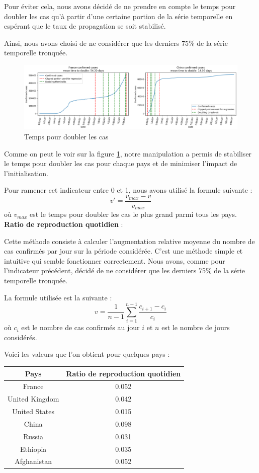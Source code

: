 \documentclass[12pt]{iEEEtran}
\begin{document}
Pour éviter cela, nous avons décidé de ne prendre en compte le temps pour doubler les cas qu'à partir
d'une certaine portion de la série temporelle en espérant que le taux de propagation se soit stabilisé.

Ainsi, nous avons choisi de ne considérer que les derniers 75\% de la série temporelle tronquée.

\begin{figure}[h]
    \centering
    \includegraphics[width=\columnwidth]{img/time_double.png}
    \caption{Temps pour doubler les cas}

    \label{fig:time_double}
\end{figure}

Comme on peut le voir sur la figure \ref{fig:time_double}, notre manipulation a permis de stabiliser
le temps pour doubler les cas pour chaque pays et de minimiser l'impact de l'initialisation.

Pour ramener cet indicateur entre 0 et 1, nous avons utilisé la formule suivante :
$$v' = \frac{v_{max}-v}{v_{max}}$$ où $v_{max}$ est le temps pour doubler les cas le plus grand parmi
tous les pays.
\\

\noindent\textbf{Ratio de reproduction quotidien} :

Cette méthode consiste à calculer l'augmentation relative moyenne du nombre de cas confirmés par jour
sur la période considérée. C'est une méthode simple et intuitive qui semble fonctionner correctement.
Nous avons, comme pour l'indicateur précédent, décidé de ne considérer que les derniers 75\% de la série
temporelle tronquée.

La formule utilisée est la suivante :
$$v = \frac{1}{n-1} \sum_{i=1}^{n-1} \frac{c_{i+1} - c_i}{c_i}$$ où $c_i$ est le nombre de cas confirmés
au jour $i$ et $n$ est le nombre de jours considérés.

Voici les valeurs que l'on obtient pour quelques pays :
\begin{table}[h]
    \centering
    \begin{tabular}{|c|c|}
        \hline
        Pays & Ratio de reproduction quotidien \\
        \hline
        France & 0.052 \\
        United Kingdom & 0.042 \\
        United States & 0.015 \\
        China & 0.098 \\
        Russia & 0.031 \\
        Ethiopia & 0.035 \\
        Afghanistan & 0.052 \\
        \hline
    \end{tabular}
\end{table}
\end{document}
